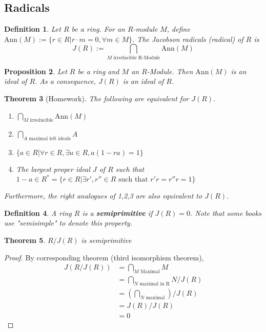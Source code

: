 \documentclass[letterpaper, leqno, 12pt]{article}
\newcommand{\Ann}{\mbox{Ann}}
\theoremstyle{stdthm}
\newtheorem{thm}{Theorem}
\newtheorem{prop}[thm]{Proposition}
\theoremstyle{stddef}
\newtheorem{defn}[thm]{Definition}
\theoremstyle{stdnonum}
\theoremstyle{stdqands}
\theoremstyle{stdbold}
\begin{document}
\subsection*{Radicals}

\begin{defn}
Let $R$ be a ring. For an $R$-module $M$, define $\Ann(M) := \{ r \in R| r \cdot m = 0, \forall m \in M\}$. The Jacobson radicals (radical) of $R$ is 
\[ J(R) := \bigcap_{M \text{ irreducible R-Module}} \Ann(M) \]
\end{defn}


\begin{prop}
Let $R$ be a ring and $M$ an $R$-Module. Then $\Ann(M)$ is an ideal of $R$. As a consequence, $J(R)$ is an ideal of $R$. 
\end{prop}

\begin{thm}[Homework]
The following are equivalent for $J(R)$. 
\begin{enumerate}
\item $\bigcap_{M \text{ irreducible}} \Ann(M)$
\item $\bigcap_{A \text{ maximal left ideals}} A$
\item $\{a \in R| \forall r \in R, \exists u \in R, a(1-ra) = 1\}$
\item The largest proper ideal $J$ of $R$ such that $1-a \in R^* = \{r \in R| \exists r', r'' \in R \text{ such that } r'r = r''r =1\}$ 
\end{enumerate}
Furthermore, the right analogues of 1,2,3 are also equivalent to $J(R)$. 
\end{thm}


\begin{defn}
A ring $R$ is a {\bf semiprimitive} if $J(R) = 0$. Note that some books use "semisimple" to denote this property.  
\end{defn}


\begin{thm}
$R/J(R)$ is semiprimitive
\end{thm}

\begin{proof}
By corresponding theorem (third isomorphism theorem), 
\begin{align*}
J(R/J(R)) &= \bigcap_{M \text{ Maximal}} M\\
&= \bigcap_{N \text{ maximal in R}} N/J(R)\\
&= \left(\bigcap_{N \text{ maximal}}\right)/J(R)\\
&= J(R)/J(R)\\
&= 0
\end{align*}
\end{proof}
\end{document}
